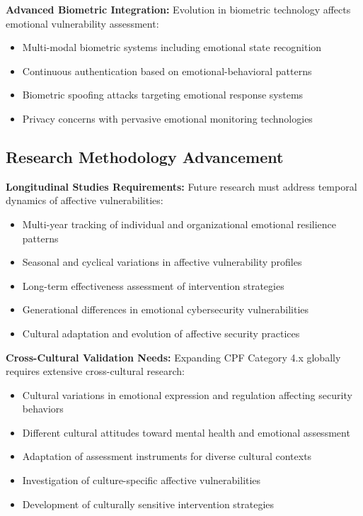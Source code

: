 \documentclass[11pt,a4paper]{article}
\begin{document}
\textbf{Advanced Biometric Integration:}
Evolution in biometric technology affects emotional vulnerability assessment:
\begin{itemize}
\item Multi-modal biometric systems including emotional state recognition
\item Continuous authentication based on emotional-behavioral patterns
\item Biometric spoofing attacks targeting emotional response systems
\item Privacy concerns with pervasive emotional monitoring technologies
\end{itemize}

\subsection{Research Methodology Advancement}

\textbf{Longitudinal Studies Requirements:}
Future research must address temporal dynamics of affective vulnerabilities:
\begin{itemize}
\item Multi-year tracking of individual and organizational emotional resilience patterns
\item Seasonal and cyclical variations in affective vulnerability profiles
\item Long-term effectiveness assessment of intervention strategies
\item Generational differences in emotional cybersecurity vulnerabilities
\item Cultural adaptation and evolution of affective security practices
\end{itemize}

\textbf{Cross-Cultural Validation Needs:}
Expanding CPF Category 4.x globally requires extensive cross-cultural research:
\begin{itemize}
\item Cultural variations in emotional expression and regulation affecting security behaviors
\item Different cultural attitudes toward mental health and emotional assessment
\item Adaptation of assessment instruments for diverse cultural contexts
\item Investigation of culture-specific affective vulnerabilities
\item Development of culturally sensitive intervention strategies
\end{itemize}
\end{document}
